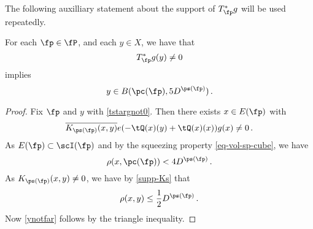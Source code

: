 The following auxilliary statement about the support of $T_\fp^*g$ will be used repeatedly.

\begin{lemma}\label{tile-range-support}
    \leanok
        For each $\fp\in \fP$, and each $y\in X$, we have that
    \begin{equation}\label{tstargnot0}
         T_{\fp}^* g(y)\neq 0
    \end{equation}
       implies
    \begin{equation}\label{ynotfar}
        y\in B(\pc(\fp),5D^{\ps(\fp)})\, .
    \end{equation}
    \end{lemma}
    \begin{proof}
    \leanok
    Fix $\fp$ and $y$ with \eqref{tstargnot0}.
    Then there exists $x\in E(\fp)$ with
    \begin{equation}
       \overline{K_{\ps(\fp)}(x,y)}e(-\tQ(x)(y)
        +\tQ(x)(x))g(x) \neq 0\, .
    \end{equation}
    As $E(\fp)\subset \scI(\fp)$ and by the squeezing property
    \eqref{eq-vol-sp-cube}, we have
    \begin{equation}
        \rho(x,\pc(\fp)) < 4D^{\ps(\fp)}\, .
    \end{equation}
    As $K_{\ps(\fp)}(x,y)\neq 0$, we have by \eqref{supp-Ks}
    that
    \begin{equation}
    \rho(x,y)\le \frac 12 D^{\ps(\fp)}\, .
    \end{equation}
    Now \eqref{ynotfar} follows by the triangle inequality.
\end{proof}


